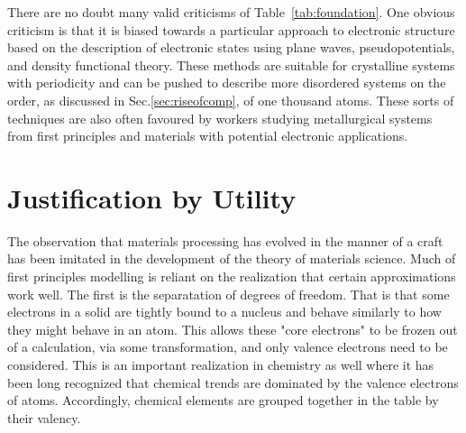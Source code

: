 There are no doubt many valid criticisms of Table~\ref{tab:foundation}.
One obvious criticism is that it is biased towards a particular approach to electronic structure
based on the description of electronic states using plane waves, pseudopotentials, and density
functional theory. These methods are suitable for crystalline systems with periodicity and can be pushed 
to describe more disordered systems on the order, as discussed in Sec.\ref{sec:riseofcomp}, 
of one thousand atoms. These sorts of techniques are also often favoured by workers 
studying metallurgical systems from first principles and materials with potential 
electronic applications.


\section{Justification by Utility}
The observation that materials processing has evolved in the manner 
of a craft has been imitated in the development of the 
theory of materials science. Much of first principles modelling is reliant on
the realization that certain approximations work well. The first is 
the separatation of degrees of freedom. That is that some electrons in a solid are
tightly bound to a nucleus and behave similarly to how they might behave in an atom.
This allows these "core electrons" to be frozen out of a calculation, 
via some transformation, and only valence electrons need to be considered. 
This is an important realization in chemistry as well where it has 
been long recognized that chemical trends are dominated by
the valence electrons of atoms. Accordingly, chemical elements are 
grouped together in the table by their valency. 

